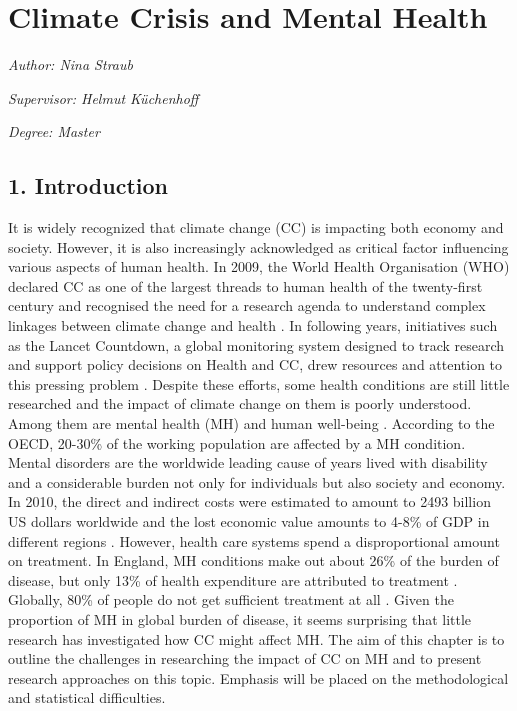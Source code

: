 \documentclass[
]{krantz}
\begin{document}
\chapter{Climate Crisis and Mental Health}\label{menh3}

\emph{Author: Nina Straub}

\emph{Supervisor: Helmut Küchenhoff}

\emph{Degree: Master}

\section{1. Introduction}\label{introduction-6}

It is widely recognized that climate change (CC) is impacting both economy and society. However, it is also increasingly acknowledged as critical factor influencing various aspects of human health. In 2009, the World Health Organisation (WHO) declared CC as one of the largest threads to human health of the twenty-first century and recognised the need for a research agenda to understand complex linkages between climate change and health \citep{worldhealthorganizationProtectingHealthClimate2009}. In following years, initiatives such as the Lancet Countdown, a global monitoring system designed to track research and support policy decisions on Health and CC, drew resources and attention to this pressing problem \citep{wattsLancetCountdownHealth2018}. Despite these efforts, some health conditions are still little researched and the impact of climate change on them is poorly understood. Among them are mental health (MH) and human well-being \citep{romanello2023ReportLancet2023a}.
According to the OECD, 20-30\% of the working population are affected by a MH condition. Mental disorders are the worldwide leading cause of years lived with disability \citep[\citet{hewlette.MakingMentalHealth2014}]{whitefordGlobalBurdenDisease2013} and a considerable burden not only for individuals but also society and economy. In 2010, the direct and indirect costs were estimated to amount to 2493 billion US dollars worldwide \citep{hewlette.MakingMentalHealth2014} and the lost economic value amounts to 4-8\% of GDP in different regions \citep{ariasQuantifyingGlobalBurden2022}. However, health care systems spend a disproportional amount on treatment. In England, MH conditions make out about 26\% of the burden of disease, but only 13\% of health expenditure are attributed to treatment \citep{hewlette.MakingMentalHealth2014}. Globally, 80\% of people do not get sufficient treatment at all \citep{worldhealthorganizationComprehensiveMentalHealth2021}.
Given the proportion of MH in global burden of disease, it seems surprising that little research has investigated how CC might affect MH. The aim of this chapter is to outline the challenges in researching the impact of CC on MH and to present research approaches on this topic. Emphasis will be placed on the methodological and statistical difficulties.
\end{document}
